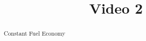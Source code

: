\documentclass[handout]{ximera}
\title{Video 2}
\begin{document}
\begin{abstract}
Constant Fuel Economy
\end{abstract}

\maketitle

\end{document}
